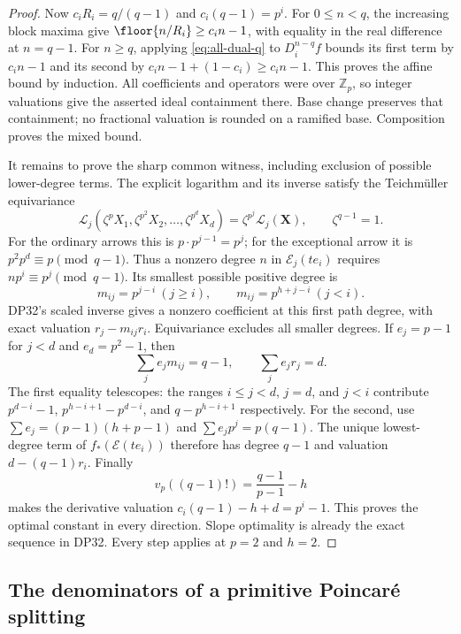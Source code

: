 \documentclass[11pt,a4paper]{article}
\theoremstyle{definition}\newtheorem{remark}[theorem]{Remark}
\newcommand{\Z}{\mathbb Z}\newcommand{\Q}{\mathbb Q}\newcommand{\F}{\mathbb F}
\begin{document}
\begin{proof}
Now $c_iR_i=q/(q-1)$ and $c_i(q-1)=p^i$. For $0\le n<q$, the increasing block maxima give $\floor{n/R_i}\ge c_i n-1$, with equality in the real difference at $n=q-1$. For $n\ge q$, applying \eqref{eq:all-dual-q} to $D_i^{n-q}f$ bounds its first term by $c_i n-1$ and its second by $c_i n-1+(1-c_i)\ge c_i n-1$. This proves the affine bound by induction. All coefficients and operators were over $\Z_p$, so integer valuations give the asserted ideal containment there. Base change preserves that containment; no fractional valuation is rounded on a ramified base. Composition proves the mixed bound.

It remains to prove the sharp common witness, including exclusion of possible lower-degree terms. The explicit logarithm and its inverse satisfy the Teichm\"uller equivariance
\[
 \mathcal L_j(\zeta^pX_1,\zeta^{p^2}X_2,\ldots,\zeta^{p^d}X_d)
 =\zeta^{p^j}\mathcal L_j(\mathbf X),\qquad\zeta^{q-1}=1.
\]
For the ordinary arrows this is $p\cdot p^{j-1}=p^j$; for the exceptional arrow it is $p^2p^d\equiv p\pmod{q-1}$. Thus a nonzero degree $n$ in $\mathcal E_j(te_i)$ requires $np^i\equiv p^j\pmod{q-1}$. Its smallest possible positive degree is
\[
 m_{ij}=p^{j-i}\ (j\ge i),\qquad m_{ij}=p^{h+j-i}\ (j<i).
\]
DP32's scaled inverse gives a nonzero coefficient at this first path degree, with exact valuation $r_j-m_{ij}r_i$. Equivariance excludes all smaller degrees. If $e_j=p-1$ for $j<d$ and $e_d=p^2-1$, then
\[
 \sum_j e_jm_{ij}=q-1,\qquad \sum_j e_jr_j=d.
\]
The first equality telescopes: the ranges $i\le j<d$, $j=d$, and $j<i$ contribute $p^{d-i}-1$, $p^{h-i+1}-p^{d-i}$, and $q-p^{h-i+1}$ respectively. For the second, use $\sum e_j=(p-1)(h+p-1)$ and $\sum e_jp^j=p(q-1)$. The unique lowest-degree term of $f_*(\mathcal E(te_i))$ therefore has degree $q-1$ and valuation $d-(q-1)r_i$. Finally
\[
 v_p((q-1)!)=\frac{q-1}{p-1}-h
\]
makes the derivative valuation $c_i(q-1)-h+d=p^i-1$. This proves the optimal constant in every direction. Slope optimality is already the exact sequence in DP32. Every step applies at $p=2$ and $h=2$.
\end{proof}

\subsection{The denominators of a primitive Poincar\'e splitting}
\end{document}
